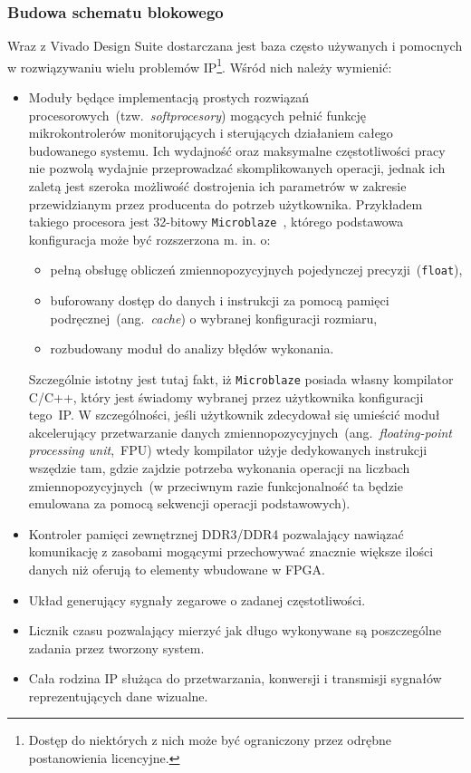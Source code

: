\subsubsection{Budowa schematu blokowego}
Wraz z Vivado Design Suite dostarczana jest baza często używanych i pomocnych w rozwiązywaniu wielu problemów IP\footnote{Dostęp do niektórych z nich może być ograniczony przez odrębne postanowienia licencyjne.}. Wśród nich należy wymienić:
\begin{itemize}
\item Moduły będące implementacją prostych rozwiązań procesorowych~(tzw.~\textit{softprocesory}) mogących pełnić funkcję mikrokontrolerów monitorujących i sterujących działaniem całego budowanego systemu. Ich wydajność oraz maksymalne częstotliwości pracy nie pozwolą wydajnie przeprowadzać skomplikowanych operacji, jednak ich zaletą jest szeroka możliwość dostrojenia ich parametrów w zakresie przewidzianym przez producenta do potrzeb użytkownika. Przykładem takiego procesora jest 32-bitowy  \texttt{Microblaze}~\cite{MB_QUICK}\cite{MB_UG984}, którego podstawowa konfiguracja może być rozszerzona m. in. o:
\begin{itemize}
\item pełną obsługę obliczeń zmiennopozycyjnych pojedynczej precyzji~(\texttt{float}),
\item buforowany dostęp do danych i instrukcji za pomocą pamięci podręcznej~(ang.~\textit{cache}) o wybranej konfiguracji rozmiaru,
\item rozbudowany moduł do analizy błędów wykonania.
\end{itemize}
Szczególnie istotny jest tutaj fakt, iż \texttt{Microblaze} posiada własny kompilator C/C++, który jest świadomy wybranej przez użytkownika konfiguracji tego~IP. W szczególności, jeśli użytkownik zdecydował się umieścić moduł akcelerujący przetwarzanie danych zmiennopozycyjnych~(ang.~\textit{floating-point processing unit},~FPU) wtedy kompilator użyje dedykowanych instrukcji wszędzie tam, gdzie zajdzie potrzeba wykonania operacji na liczbach zmiennopozycyjnych~(w przeciwnym razie funkcjonalność ta będzie emulowana za pomocą sekwencji operacji podstawowych).
\item Kontroler pamięci zewnętrznej DDR3/DDR4 pozwalający nawiązać komunikację z zasobami mogącymi przechowywać znacznie większe ilości danych niż oferują to elementy wbudowane w FPGA.
\item Układ generujący sygnały zegarowe o zadanej częstotliwości.
\item Licznik czasu pozwalający mierzyć jak długo wykonywane są poszczególne zadania przez tworzony system.
\item Cała rodzina IP służąca do przetwarzania, konwersji i transmisji sygnałów reprezentujących dane wizualne.
\end{itemize}
